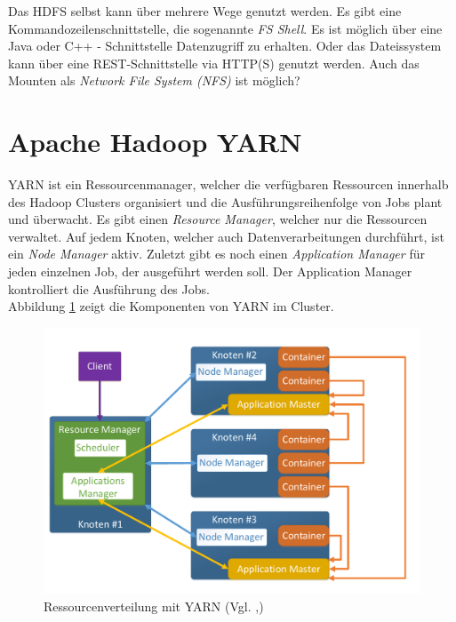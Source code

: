 \noindent
Das HDFS selbst kann über mehrere Wege genutzt werden. Es gibt eine Kommandozeilenschnittstelle, die sogenannte \textit{FS Shell}. Es ist möglich über eine Java oder C++ - Schnittstelle Datenzugriff zu erhalten. Oder das Dateissystem kann über eine REST-Schnittstelle via HTTP(S) genutzt werden. Auch das Mounten als \textit{Network File System (NFS)} ist möglich?

\section{Apache Hadoop YARN}
\label{sec:theory_yarn}
YARN ist ein Ressourcenmanager, welcher die verfügbaren Ressourcen innerhalb des Hadoop Clusters organisiert und die Ausführungsreihenfolge von Jobs plant und überwacht. Es gibt einen \textit{Resource Manager}, welcher nur die Ressourcen verwaltet. Auf jedem Knoten, welcher auch Datenverarbeitungen durchführt, ist ein \textit{Node Manager} aktiv. Zuletzt gibt es noch einen \textit{Application Manager} für jeden einzelnen Job, der ausgeführt werden soll. Der Application Manager kontrolliert die Ausführung des Jobs.\\
Abbildung \ref{fig:yarn_cluster_architecture} zeigt die Komponenten von YARN im Cluster.\\

\begin{figure}[ht]
  \centering
  \includegraphics[width=\textwidth]{./resource/yarn_cluster_architecture.pdf}
  \caption{Ressourcenverteilung mit YARN (Vgl. \cite{yarn_architecture},\cite{expert_hadoop_admin})}
  \label{fig:yarn_cluster_architecture}
\end{figure}

